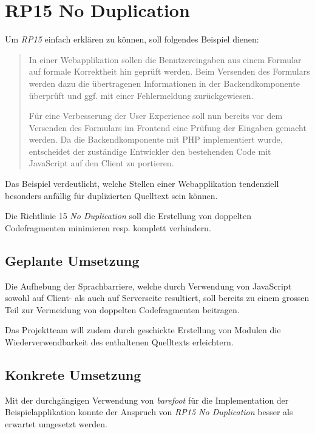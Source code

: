 \section{RP15 No Duplication}
\label{sec:principle-rp15-no-duplication}

Um \emph{RP15} einfach erklären zu können, soll folgendes Beispiel dienen:

\begin{quotation}
In einer Webapplikation sollen die Benutzereingaben aus einem Formular auf formale Korrektheit hin geprüft werden. Beim Versenden des Formulars werden dazu die übertragenen Informationen in der Backendkomponente überprüft und ggf. mit einer Fehlermeldung zurückgewiesen.

Für eine Verbesserung der User Experience soll nun bereits vor dem Versenden des Formulars im Frontend eine Prüfung der Eingaben gemacht werden. Da die Backendkomponente mit PHP implementiert wurde, entscheidet der zuständige Entwickler den bestehenden Code mit JavaScript auf den Client zu portieren.
\end{quotation}

Das Beispiel verdeutlicht, welche Stellen einer Webapplikation tendenziell besonders anfällig für duplizierten Quelltext sein können.

Die Richtlinie 15 \emph{No Duplication} soll die Erstellung von doppelten Codefragmenten minimieren resp. komplett verhindern.


\subsection*{Geplante Umsetzung}

Die Aufhebung der Sprachbarriere, welche durch Verwendung von JavaScript sowohl auf Client- als auch auf Serverseite resultiert, soll bereits zu einem grossen Teil zur Vermeidung von doppelten Codefragmenten beitragen.

Das Projektteam will zudem durch geschickte Erstellung von Modulen die Wiederverwendbarkeit des enthaltenen Quelltexts erleichtern.


\subsection*{Konkrete Umsetzung}

Mit der durchgängigen Verwendung von \emph{barefoot} \cite{Barefoot} für die Implementation der Beispielapplikation konnte der Anspruch von \emph{RP15 No Duplication} besser als erwartet umgesetzt werden.

